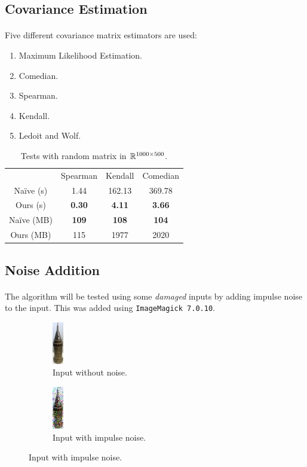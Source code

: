 \documentclass{beamer}
\theoremstyle{definition}
\theoremstyle{remark}
\theoremstyle{example}
\newif\ifinsection
\newif\ifinsubsection
\let\oldsubsection\subsection
\renewcommand{\subsection}{
  \global\insubsectiontrue
  \oldsubsection}
\newcommand {\aframe}[1] {
  \begin{frame}
    \ifinsection\frametitle{\secname}\fi
    \ifinsubsection\framesubtitle{\subsecname}\fi
  #1
  \end{frame}
}
\begin{document}
\subsection{Covariance Estimation}
\aframe{ Five different covariance matrix estimators are used:
  \begin{enumerate}
    \item Maximum Likelihood Estimation.
    \item Comedian\parencite{falk1997mad}.
    \item Spearman\parencite{spearman1961general}.
    \item Kendall\parencite{kendall1938new}.
    \item Ledoit and Wolf\parencite{ledoit2004honey}.
  \end{enumerate} \pause
  \begin{table}[]
    \centering
    \begin{tabular}{cccc}
      \hline
      & Spearman      & Kendall       & Comedian      \\
      Na\"ive (s)  & 1.44          & 162.13        & 369.78        \\
      Ours (s)   & \textbf{0.30} & \textbf{4.11} & \textbf{3.66} \\
      Na\"ive (MB) & \textbf{109}  & \textbf{108}  & \textbf{104}  \\
      Ours (MB)  & 115           & 1977          & 2020    \\     \hline
    \end{tabular}
    \caption{Tests with random matrix in ${\mathbb{R}}^{1000\times500}$.}
  \end{table}
}

\subsection{Noise Addition}
\aframe{The algorithm will be tested using some \textit{damaged} inputs by
  adding impulse noise to the input. This was added using \texttt{ImageMagick
    7.0.10}.
  \begin{figure}
    \centering
    \begin{subfigure}[b]{0.45\textwidth}
      \centering \includegraphics[height=0.55\textheight]{figs/input1.jpg}
      \caption{Input without noise.}
    \end{subfigure}
    \begin{subfigure}[b]{0.45\textwidth}
      \centering
      \includegraphics[height=0.55\textheight]{figs/input-impulse.jpg}
      \caption{Input with impulse noise.}
    \end{subfigure}
  \end{figure}
}
\end{document}
